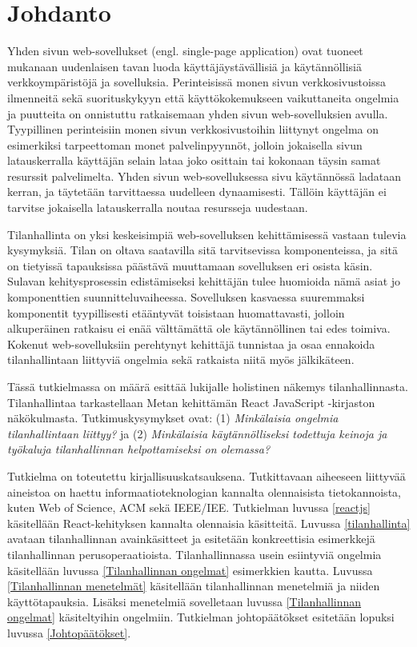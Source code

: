 \chapter{Johdanto} \label{johdanto}


Yhden sivun web-sovellukset (engl. single-page application) ovat tuoneet mukanaan uudenlaisen tavan luoda käyttäjäystävällisiä ja käytännöllisiä verkkoympäristöjä ja sovelluksia. Perinteisissä monen sivun verkkosivustoissa ilmenneitä sekä suorituskykyyn että käyttökokemukseen vaikuttaneita ongelmia ja puutteita on onnistuttu ratkaisemaan yhden sivun web-sovelluksien avulla. Tyypillinen perinteisiin monen sivun verkkosivustoihin liittynyt ongelma on esimerkiksi tarpeettoman monet palvelinpyynnöt, jolloin jokaisella sivun latauskerralla käyttäjän selain lataa joko osittain tai kokonaan täysin samat resurssit palvelimelta. Yhden sivun web-sovelluksessa sivu käytännössä ladataan kerran, ja täytetään tarvittaessa uudelleen dynaamisesti. Tällöin käyttäjän ei tarvitse jokaisella latauskerralla noutaa resursseja uudestaan.

Tilanhallinta on yksi keskeisimpiä web-sovelluksen kehittämisessä vastaan tulevia kysymyksiä. Tilan on oltava saatavilla sitä tarvitsevissa komponenteissa, ja sitä on tietyissä tapauksissa päästävä muuttamaan sovelluksen eri osista käsin. Sulavan kehitysprosessin edistämiseksi kehittäjän tulee huomioida nämä asiat jo komponenttien suunnitteluvaiheessa. Sovelluksen kasvaessa suuremmaksi komponentit tyypillisesti etääntyvät toisistaan huomattavasti, jolloin alkuperäinen ratkaisu ei enää välttämättä ole käytännöllinen tai edes toimiva. Kokenut web-sovelluksiin perehtynyt kehittäjä tunnistaa ja osaa ennakoida tilanhallintaan liittyviä ongelmia sekä ratkaista niitä myös jälkikäteen.

Tässä tutkielmassa on määrä esittää lukijalle holistinen näkemys tilanhallinnasta. Tilanhallintaa tarkastellaan Metan kehittämän React JavaScript -kirjaston näkökulmasta. Tutkimuskysymykset ovat: (1) \textit{Minkälaisia ongelmia tilanhallintaan liittyy?} ja (2) \textit{Minkälaisia käytännölliseksi todettuja keinoja ja työkaluja tilanhallinnan helpottamiseksi on olemassa?}

Tutkielma on toteutettu kirjallisuuskatsauksena. Tutkittavaan aiheeseen liittyvää aineistoa on haettu informaatioteknologian kannalta olennaisista tietokannoista, kuten Web of Science, ACM sekä IEEE/IEE. Tutkielman luvussa \ref{reactjs} käsitellään React-kehityksen kannalta olennaisia käsitteitä. Luvussa \ref{tilanhallinta} avataan tilanhallinnan avainkäsitteet ja esitetään konkreettisia esimerkkejä tilanhallinnan perusoperaatioista. Tilanhallinnassa usein esiintyviä ongelmia käsitellään luvussa \ref{Tilanhallinnan ongelmat} esimerkkien kautta. Luvussa \ref{Tilanhallinnan menetelmät} käsitellään tilanhallinnan menetelmiä ja niiden käyttötapauksia. Lisäksi menetelmiä sovelletaan luvussa \ref{Tilanhallinnan ongelmat} käsiteltyihin ongelmiin. Tutkielman johtopäätökset esitetään lopuksi luvussa \ref{Johtopäätökset}.